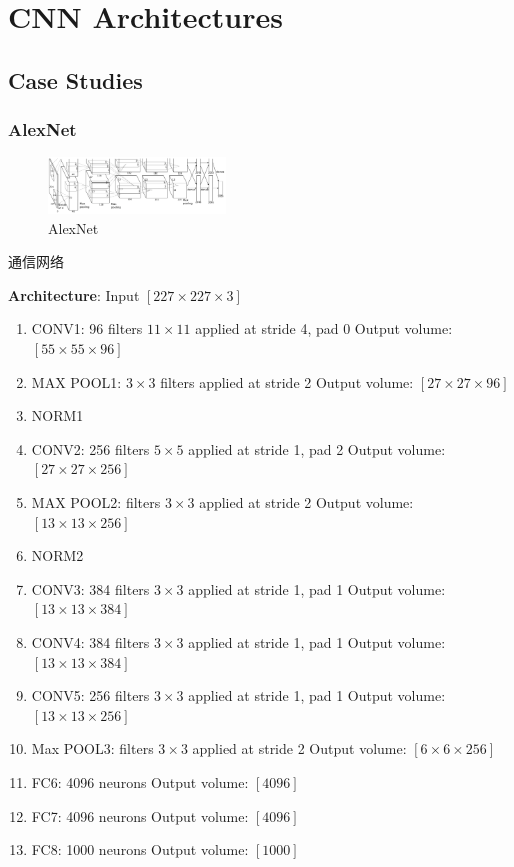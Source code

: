 \newpage
\section{CNN Architectures}
\subsection{Case Studies}
\subsubsection{AlexNet}
\begin{figure}[!htb]
    \centering
    \includegraphics[width=0.42\textwidth]{pic/Lec9/AlexNet.png}
    \caption{AlexNet}
\end{figure}
通信网络

\textbf{Architecture}: Input $[227\times 227\times 3]$
\begin{enumerate}
    \item CONV1: 96 filters $11\times 11$ applied at stride 4, pad 0 
    \subitem Output volume: $[55\times 55\times 96]$
    \item MAX POOL1: $3\times3$ filters applied at stride 2
    \subitem Output volume: $[27\times 27\times 96]$
    \item NORM1
    \item CONV2: 256 filters $5\times 5$ applied at stride 1, pad 2 
    \subitem Output volume: $[27\times 27\times 256]$
    \item MAX POOL2: filters $3\times 3$ applied at stride 2
    \subitem Output volume: $[13\times 13\times 256]$
    \item NORM2
    \item CONV3: 384 filters $3\times 3$ applied at stride 1, pad 1
    \subitem Output volume: $[13\times 13\times 384]$
    \item CONV4: 384 filters $3\times 3$ applied at stride 1, pad 1 
    \subitem Output volume: $[13\times 13\times 384]$
    \item CONV5: 256 filters $3\times 3$ applied at stride 1, pad 1 
    \subitem Output volume: $[13\times 13\times 256]$
    \item Max POOL3: filters $3\times 3$ applied at stride 2
    \subitem Output volume: $[6\times 6\times 256]$
    \item FC6: 4096 neurons
    \subitem Output volume: $[4096]$
    \item FC7: 4096 neurons
    \subitem Output volume: $[4096]$
    \item FC8: 1000 neurons
    \subitem Output volume: $[1000]$
\end{enumerate}


